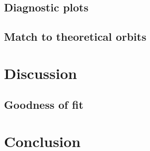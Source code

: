 \documentclass[]{report}
\begin{document}
\section{Diagnostic plots}

\section{Match to theoretical orbits}



\chapter{Discussion}

\section{Goodness of fit}



\chapter{Conclusion}



%
%
%
%
%


\end{document}
